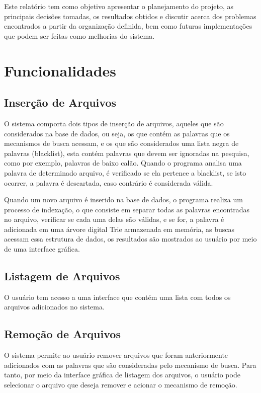 \documentclass[12pt]{article}
\begin{document}
Este relatório tem como objetivo apresentar o planejamento do projeto, as principais decisões tomadas, os resultados obtidos e discutir acerca dos problemas encontrados a partir da organização definida, bem como futuras implementações que podem ser feitas como melhorias do sistema.

\section{Funcionalidades}
\subsection{Inserção de Arquivos}

O sistema comporta dois tipos de inserção de arquivos, aqueles que são considerados na base de dados, ou seja, os que contém as palavras que os mecanismos de busca acessam, e os que são considerados uma lista negra de palavras (blacklist), esta contém palavras que devem ser ignoradas na pesquisa, como por exemplo, palavras de baixo calão. Quando o programa analisa uma palavra de determinado arquivo, é verificado se ela pertence a blacklist, se isto ocorrer, a palavra é descartada, caso contrário é considerada válida. 

Quando um novo arquivo é inserido na base de dados, o programa realiza um processo de indexação, o que consiste em separar todas as palavras encontradas no arquivo, verificar se cada uma delas são válidas, e se for, a palavra é adicionada em uma árvore digital Trie armazenada em memória, as buscas acessam essa estrutura de dados, os resultados são mostrados ao usuário por meio de uma interface gráfica.

\subsection{Listagem de Arquivos}
O usuário tem acesso a uma interface que contém uma lista com todos os arquivos adicionados no sistema.

\subsection{Remoção de Arquivos}
O sistema permite ao usuário remover arquivos que foram anteriormente adicionados com as palavras que são consideradas pelo mecanismo de busca. Para tanto, por meio da interface gráfica de listagem dos arquivos, o usuário pode selecionar o arquivo que deseja remover e acionar o mecanismo de remoção.
\end{document}
